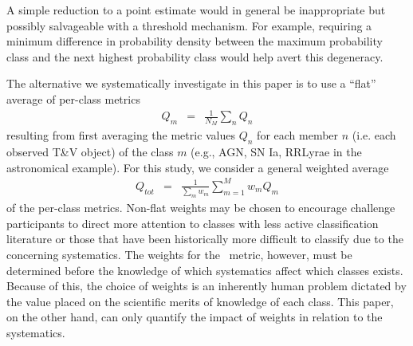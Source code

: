 A simple reduction to a point estimate would in general be inappropriate but possibly salvageable with a threshold mechanism.
For example, requiring a minimum difference in probability density between the maximum probability class and the next highest probability class would help avert this degeneracy.

The alternative we systematically investigate in this paper is to use a ``flat'' average of per-class metrics
\begin{eqnarray}
  \label{eq:perclassavg}
Q_{m} &=& \frac{1}{N_{M}}\sum_{n}Q_{n}
\end{eqnarray}
resulting from first averaging the metric values $Q_{n}$ for each member $n$ (i.e. each observed T\&V object) of the class $m$ (e.g., AGN, SN Ia, RRLyrae in the astronomical example).
For this study, we consider a general weighted average
\begin{eqnarray}
  \label{eq:weightavg}
Q_{tot} &=& \frac{1}{\sum_{m}w_{m}}\sum_{m=1}^{M}w_{m}Q_{m}
\end{eqnarray}
of the per-class metrics.
Non-flat weights may be chosen to encourage challenge participants to direct more attention to classes with less active classification literature or those that have been historically more difficult to classify due to the concerning systematics.
The weights for the \plasticc\ metric, however, must be determined before the knowledge of which systematics affect which classes exists.
Because of this, the choice of weights is an inherently human problem dictated by the value placed on the scientific merits of knowledge of each class.
This paper, on the other hand, can only quantify the impact of weights in relation to the systematics.
